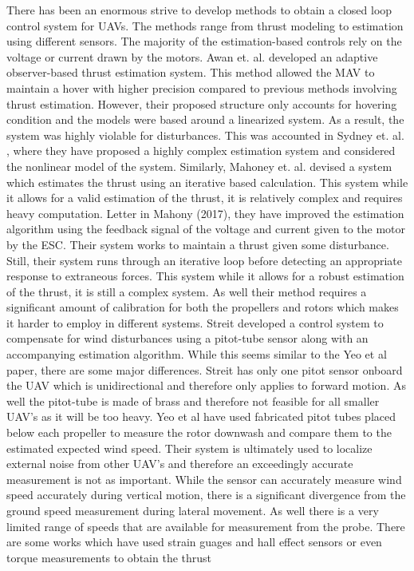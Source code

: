 \documentclass[conference]{IEEEtran}
\begin{document}
There has been an enormous strive to develop methods to obtain a closed loop control system for UAVs. The methods range from thrust modeling to estimation using different sensors. The majority of the estimation-based controls rely on the voltage or current drawn by the motors.
Awan et. al. \cite{awan} developed an adaptive observer-based thrust estimation system. This method allowed the MAV to maintain a hover with higher precision compared to previous methods involving thrust estimation. However, their proposed structure only accounts for hovering condition and the models were based around a linearized system. As a result, the system was highly violable for disturbances. This was accounted in Sydney et. al. \cite{sydney}, where they have proposed a highly complex estimation system and considered the nonlinear model of the system. Similarly, Mahoney et. al. \cite{mahoney1} devised a system which estimates the thrust using an iterative based calculation. This system while it allows for a valid estimation of the thrust, it is relatively complex and requires heavy computation. Letter in Mahony (2017), they have improved the estimation algorithm using the feedback signal of the voltage and current given to the motor by the ESC. Their system works to maintain a thrust given some disturbance. Still, their system runs through an iterative loop before detecting an appropriate response to extraneous forces. This system while it allows for a robust estimation of the thrust, it is still a complex system. As well their method requires a significant amount of calibration for both the propellers and rotors which makes it harder to employ in different systems. Streit \cite{streit} developed a control system to compensate for wind disturbances using a pitot-tube sensor along with an accompanying estimation algorithm. While this seems similar to the Yeo et al paper, there are some major differences. Streit \cite{streit} has only one pitot sensor onboard the UAV which is unidirectional and therefore only applies to forward motion. As well the pitot-tube is made of brass and therefore not feasible for all smaller UAV’s as it will be too heavy. Yeo et al have used fabricated pitot tubes placed below each propeller to measure the rotor downwash and compare them to the estimated expected wind speed. Their system is ultimately used to localize external noise from other UAV’s and therefore an exceedingly accurate measurement is not as important. While the sensor can accurately measure wind speed accurately during vertical motion, there is a significant divergence from the ground speed measurement during lateral movement. As well there is a very limited range of speeds that are available for measurement from the probe. There are some works which have used strain guages and hall effect sensors or even torque measurements to obtain the thrust 
\end{document}
